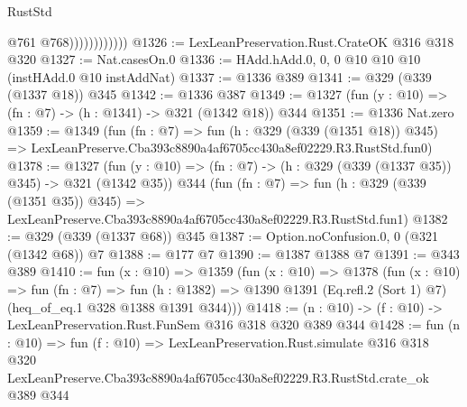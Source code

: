\begin{lexlean}{RustStd}
\begin{coremodule}
                            @761
                            @768))))))))))))
@1326 := LexLeanPreservation.Rust.CrateOK @316 @318 @320
@1327 := Nat.casesOn.{0}
@1336 := HAdd.hAdd.{0, 0, 0} @10 @10 @10 (instHAdd.{0} @10 instAddNat)
@1337 := @1336 @389
@1341 := @329 (@339 (@1337 @18)) @345
@1342 := @1336 @387
@1349 := @1327 (fun (y : @10) => (fn : @7) -> (h : @1341) -> @321 (@1342 @18)) @344
@1351 := @1336 Nat.zero
@1359 := @1349
    (fun (fn : @7) =>
    fun (h : @329 (@339 (@1351 @18)) @345) =>
    LexLeanPreserve.Cba393c8890a4af6705cc430a8ef02229.R3.RustStd.fun0)
@1378 := @1327
    (fun (y : @10) => (fn : @7) -> (h : @329 (@339 (@1337 @35)) @345) -> @321 (@1342 @35))
    @344
    (fun (fn : @7) =>
    fun (h : @329 (@339 (@1351 @35)) @345) =>
    LexLeanPreserve.Cba393c8890a4af6705cc430a8ef02229.R3.RustStd.fun1)
@1382 := @329 (@339 (@1337 @68)) @345
@1387 := Option.noConfusion.{0, 0} (@321 (@1342 @68)) @7
@1388 := @177 @7
@1390 := @1387 @1388 @7
@1391 := @343 @389
@1410 := fun (x : @10) =>
  @1359
    (fun (x : @10) =>
    @1378
      (fun (x : @10) =>
      fun (fn : @7) =>
      fun (h : @1382) =>
      @1390 @1391 (Eq.refl.{2} (Sort 1) @7) (heq_of_eq.{1} @328 @1388 @1391 @344)))
@1418 := (n : @10) -> (f : @10) -> LexLeanPreservation.Rust.FunSem @316 @318 @320 @389 @344
@1428 := fun (n : @10) =>
  fun (f : @10) =>
  LexLeanPreservation.Rust.simulate
    @316
    @318
    @320
    LexLeanPreserve.Cba393c8890a4af6705cc430a8ef02229.R3.RustStd.crate_ok
    @389
    @344
\end{coremodule}
\end{lexlean}
